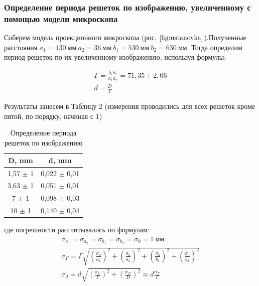 \documentclass[a4paper,12pt]{article}
\begin{document}
\newpage

\subsubsection*{Определение периода решеток по изображению, увеличенному с помощью модели микроскопа}

Соберем модель проекционного микроскопа (рис. $\ref{fig:ustanovka}$).Полученные расстояния $a_1 = 130 \ мм \ a_2 = 36 \ мм \ b_1 = 530 \ мм \ b_2 = 630 \ мм$. Тогда определим период решеток по их увеличенному изображению, используя формулы:

\begin{gather*}
\Gamma = \frac{b_1 b_2}{a_1 a_2} = 71,35 \pm 2,06 \\
d = \frac{D}{\Gamma}
\end{gather*}

Результаты занесем в Таблицу 2 (измерения проводились для всех решеток кроме пятой, по порядку, начиная с 1)

\begin{table}[h]
\begin{center}
\caption{Определение периода решеток по изображению}
\label{table:micro}
\begin{tabular}{|c|c|}
\hline
\textbf{D, mm} & \textbf{d, mm} \\ \hline
1,57 $\pm$ 1		& 0,022 $\pm$ 0,01        \\ \hline
3,63 $\pm$ 1		& 0,051 $\pm$ 0,01           \\ \hline
7  $\pm$ 1		& 0,098 $\pm$ 0,03          \\ \hline
10 $\pm$ 1		& 0,140 $\pm$ 0,04         \\ \hline
\end{tabular}
\end{center}
\end{table}

где погрешности рассчитывались по формулам:
\begin{gather*}
\sigma_{a_1} = \sigma_{a_2} = \sigma_{b_1} = \sigma_{b_2} = \sigma_0 = 1 \ мм \\
%
\sigma_{\Gamma} = \Gamma \sqrt{\left(\frac{\sigma_0}{a_1}\right)^2 + \left(\frac{\sigma_0}{a_2}\right)^2 + \left(\frac{\sigma_0}{b_1}\right)^2 + \left(\frac{\sigma_0}{b_2}\right)^2} \\
%
\sigma_{d} = d \sqrt{\left(\frac{\sigma_{\Gamma}}{\Gamma}\right)^2 +  \left(\frac{\sigma_{D}}{D}\right)^2} \approx d \frac{\sigma_{\Gamma}}{\Gamma} 
\end{gather*}
\end{document}
